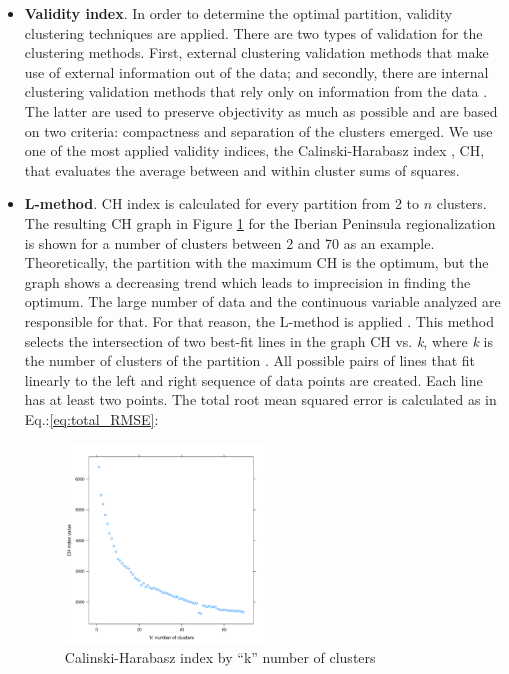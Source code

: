 \begin{itemize}
\item \textbf{Validity index}. In order to determine the optimal partition, validity clustering techniques are applied. There are two types of validation for the clustering methods. First, external clustering validation methods that make use of external information out of the data; and secondly, there are internal clustering validation methods that rely only on information from the data \cite*{Liu2010}. The latter are used to preserve objectivity as much as possible and are based on two criteria: compactness and separation of the clusters emerged. We use one of the most applied validity indices, the Calinski-Harabasz index \cite*{CalinskiH}, CH, that evaluates the average between and within cluster sums of squares.
\item \textbf{L-method}. CH index is calculated for every partition from 2 to $n$ clusters. The resulting CH graph in Figure \ref{CHindex} for the Iberian Peninsula regionalization is shown for a number of clusters between 2 and 70 as an example. Theoretically, the partition with the maximum CH is the optimum, but the graph shows a decreasing trend which leads to imprecision in finding the optimum. The large number of data and the continuous variable analyzed are responsible for that. For that reason, the L-method is applied \cite*{Salvador2004}. This method selects the intersection of two best-fit lines in the graph CH vs. \textit{k}, where \textit{k} is the number of clusters of the partition \cite*{Zagouras2013}. All possible pairs of lines that fit linearly to the left and right sequence of data points are created. Each line has at least two points. The total root mean squared error is calculated as in Eq.:\ref{eq:total_RMSE}:

\begin{figure}[h!]
\centering\includegraphics[width=0.5\textwidth]{figs/capitulo5/CHindex}
\caption[Calinski-Harabasz index by number of clusters]{Calinski-Harabasz index by ``k'' number of clusters}
\label{CHindex}
\end{figure}
 

\end{itemize}

